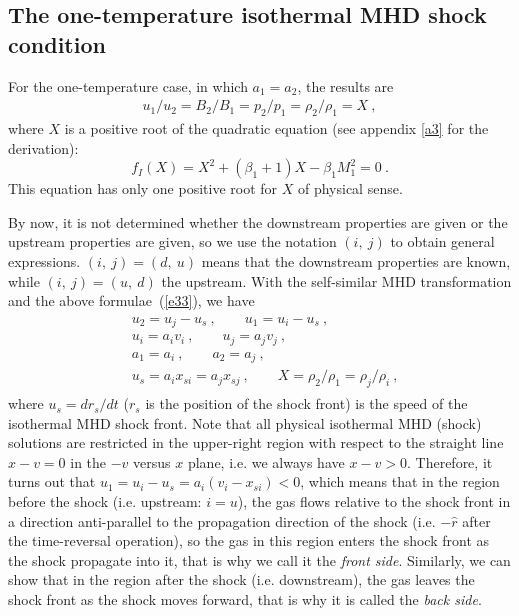 \documentclass[fleqn,usenatbib]{mnras}
\begin{document}
\subsection{The one-temperature isothermal MHD shock condition}
\label{s3.1}
For the one-temperature case, in which $a_{1}=a_{2}$, the results are
\begin{gather}
u_{1}/u_{2}=B_{2}/B_{1}=p_{2}/p_{1}
 =\rho_{2}/\rho_{1}=X\ ,\label{e33}
\end{gather}
where $X$ is a positive root of the quadratic equation (see appendix \ref{a3} for the derivation):
\begin{equation}
f_{I}(X)=X^{2}+(\beta_{1}+1)X-\beta_{1}M_{1}^{2}=0\ .\label{e34}
\end{equation}
This equation has only one positive root for $X$ of physical sense. 

By now, it is not determined whether the downstream properties are given or the upstream properties are given, so we use the notation $(i,\ j)$ to obtain general expressions. $(i,\ j)=(d,\ u)$ means that the downstream properties are known, while $(i,\ j)=(u,\ d)$ the upstream. With the self-similar MHD transformation and the above formulae~(\ref{e33}), we have
\begin{gather}
\begin{split}
&u_{2}=u_{j}-u_{s}\ , \qquad u_{1}=u_{i}-u_{s}\ ,\\
&u_{i}=a_{i}v_{i}\ , \qquad u_{j}=a_{j}v_{j}\ ,\\
&a_{1}=a_{i}\ , \qquad a_{2}=a_{j}\ ,\\
&u_{s}=a_{i}x_{si}=a_{j}x_{sj}\ , \qquad X=\rho_{2}/\rho_{1}=\rho_{j}/\rho_{i}\ ,
\end{split}\label{e35}
\end{gather}
where $u_{s}=dr_{s}/dt$ ($r_{s}$ is the position of the shock front) is the speed of the isothermal MHD shock front. Note that all physical isothermal MHD (shock) solutions are restricted in the upper-right region with respect to the straight line $x-v=0$ in the $-v$ versus $x$ plane, i.e. we always have $x-v>0$. Therefore, it turns out that $u_{1}=u_{i}-u_{s}=a_{i}\left(v_{i}-x_{si}\right)<0$, which means that in the region before the shock (i.e. upstream: $i=u$), the gas flows relative to the shock front in a direction anti-parallel to the propagation direction of the shock (i.e. $-\widehat{r}$ after the time-reversal operation), so the gas in this region enters the shock front as the shock propagate into it, that is why we call it the \textit{front side}. Similarly, we can show that in the region after the shock (i.e. downstream), the gas leaves the shock front as the shock moves forward, that is why it is called the \textit{back side}.
\end{document}
